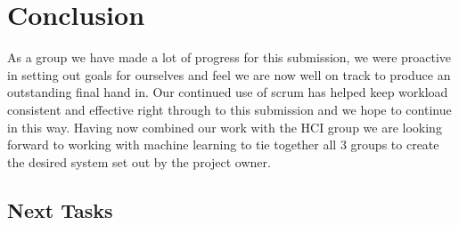 \section{Conclusion}
As a group we have made a lot of progress for this submission, we were proactive in setting out goals for ourselves and feel we are now well on track to produce an outstanding final hand in. Our continued use of scrum has helped keep workload consistent and effective right through to this submission and we hope to continue in this way. Having now combined our work with the HCI group we are looking forward to working with machine learning to tie together all 3 groups to create the desired system set out by the project owner.

\subsection{Next Tasks}